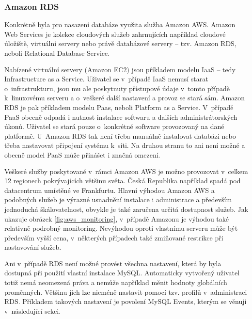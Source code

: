 \documentclass[thesis=B,czech]{FITthesis}[2012/06/26]
\begin{document}
\subsubsection{Amazon RDS}
\label{amazon-aws}
	Konkrétně byla pro nasazení databáze využita služba Amazon AWS\cite{aws}. Amazon Web Services je kolekce cloudových služeb zahrnujících například cloudové úložiště, virtuální servery nebo právě databázové servery -- tzv. Amazon RDS, neboli Relational Database Service. 
	
	Nabízené virtuální servery (Amazon EC2) jsou příkladem modelu IaaS -- tedy Infrastructure as a Service. Uživatel se v~případě IaaS nemusí starat o~infrastrukturu, jsou mu ale poskytnuty přístupové údaje v~tomto případě k~linuxovému serveru a o~veškeré další nastavení a provoz se stará sám. Amazon RDS je pak příkladem modelu Paas, neboli Platform as a Service. V~případě PaaS obecně odpadá i nutnost instalace softwaru a dalších administrátorských úkonů. Uživatel se stará pouze o~konkrétné software provozovaný na dané platformě. U~Amazon RDS tak není třeba manuálně instalovat databázi nebo třeba nastavovat připojení systému k~síti. Na druhou stranu to ani není možné a obecně model PaaS může přinášet i značná omezení. 
	
	Veškeré služby poskytované v~rámci Amazon AWS je možno provozovat v~celkem 12 regionech pokrývajících většinu světa. Česká Republika například spadá pod datacentrum umístěné ve Frankfurtu. Hlavní výhodou Amazon AWS a podobných služeb je výrazné usnadnění instalace i administrace a především jednoduchá škálovatelnost, obvykle je také zaručena určitá dostupnost služeb. Jak ukazuje obrázek \ref{fig:aws_monitoring}, v~případě Amazonu je výhodou také relativně podrobný monitoring. Nevýhodou oproti vlastnímu serveru může být především vyšší cena, v~některých případech také zmiňované restrikce při nastavování služeb. 
	
	Ani v~případě RDS není možné provést všechna nastavení, která by byla dostupná při použití vlastní instalace MySQL. Automaticky vytvořený uživatel totiž nemá neomezená práva a nemůže například měnit hodnoty globálních proměnných. Většinu jich lze nicméně nastavit pomocí tzv. profilů v~administraci RDS. Příkladem takových nastavení je povolení MySQL Events, kterým se věnuji v~následující sekci. 
\end{document}
